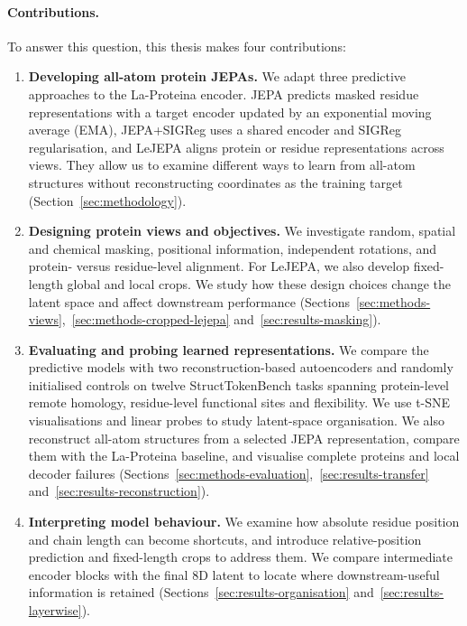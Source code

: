 \paragraph{Contributions.}
To answer this question, this thesis makes four contributions:
\begin{enumerate}[leftmargin=*,itemsep=4pt,topsep=4pt,parsep=0pt]
    \item \textbf{Developing all-atom protein JEPAs.} We adapt three predictive approaches to the La-Proteina encoder. JEPA predicts masked residue representations with a target encoder updated by an exponential moving average (EMA), JEPA+SIGReg uses a shared encoder and SIGReg regularisation, and LeJEPA aligns protein or residue representations across views. They allow us to examine different ways to learn from all-atom structures without reconstructing coordinates as the training target (Section~\ref{sec:methodology}).
    \item \textbf{Designing protein views and objectives.} We investigate random, spatial and chemical masking, positional information, independent rotations, and protein- versus residue-level alignment. For LeJEPA, we also develop fixed-length global and local crops. We study how these design choices change the latent space and affect downstream performance (Sections~\ref{sec:methods-views},~\ref{sec:methods-cropped-lejepa} and~\ref{sec:results-masking}).
    \item \textbf{Evaluating and probing learned representations.} We compare the predictive models with two reconstruction-based autoencoders and randomly initialised controls on twelve StructTokenBench tasks spanning protein-level remote homology, residue-level functional sites and flexibility. We use t-SNE visualisations and linear probes to study latent-space organisation. We also reconstruct all-atom structures from a selected JEPA representation, compare them with the La-Proteina baseline, and visualise complete proteins and local decoder failures (Sections~\ref{sec:methods-evaluation},~\ref{sec:results-transfer} and~\ref{sec:results-reconstruction}).
    \item \textbf{Interpreting model behaviour.} We examine how absolute residue position and chain length can become shortcuts, and introduce relative-position prediction and fixed-length crops to address them. We compare intermediate encoder blocks with the final 8D latent to locate where downstream-useful information is retained (Sections~\ref{sec:results-organisation} and~\ref{sec:results-layerwise}).
\end{enumerate}

